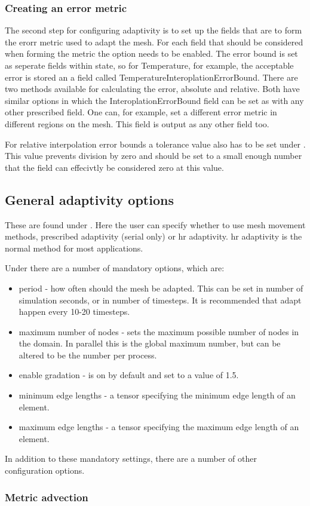\subsubsection{Creating an error metric}
\label{sect:configuring_fluidity_error_metric}

The second step for configuring adaptivity is to set up the fields that are to form the erorr metric used
to adapt the mesh. For each field that should be considered when forming the metric the option
 needs to be enabled. The error bound is set as seperate fields within 
state, so for Temperature, for example, the acceptable error is stored an a field called 
TemperatureInteroplationErrorBound. There are two methods available for calculating the error, absolute and relative.
Both have similar options in which the InteroplationErrorBound field can be set as with any other prescribed field.
One can, for example, set a different error metric in different regions on the mesh. This field
is output as any other field too.

For relative interpolation error bounds a tolerance value also has to be set under 
. This value prevents division by zero
and should be set to a small enough number that the field can effecivtly be considered zero at this value.

\subsection{General adaptivity options}
\label{sect:configuring_fluidity_adaptivity_options}

These are found under . Here the user can specify whether to use mesh movement methods, 
prescribed adaptivity (serial only) or hr adaptivity. hr adaptivity is the normal method for most applications.

Under  there are a number of mandatory options, which are:
\begin{itemize}
\item period - how often should the mesh be adapted. This can be set in number of simulation seconds, 
or in number of timesteps. It is recommended that adapt happen every 10-20 timesteps.
\item maximum number of nodes - sets the maximum possible number of nodes in the domain. In parallel this is the
global maximum number, but can be altered to be the number per process.
\item enable gradation - is on by default and set to a value of 1.5. 
\item minimum edge lengths - a tensor specifying the minimum edge length of an element.
\item maximum edge lengths - a tensor specifying the maximum edge length of an element.
\end{itemize}

In addition to these mandatory settings, there are a number of other configuration options.

\subsubsection{Metric advection}
\label{sect:configuring_fluidity_metric_advection}
